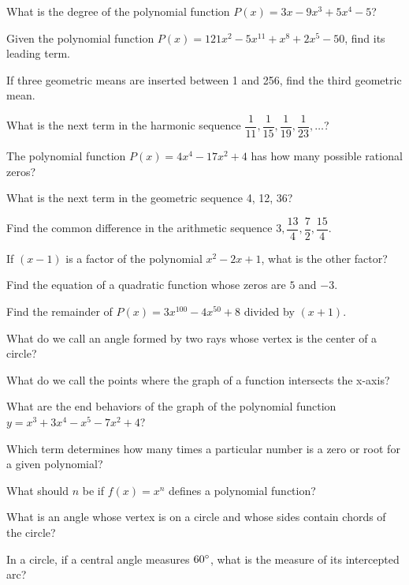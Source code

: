 \begin{questions}

\question What is the degree of the polynomial function $P(x) = 3x - 9x^3 + 5x^4 -5$?  

\question Given the polynomial function $P(x) = 121x^2 - 5x^{11} + x^8 + 2x^5 - 50$, find its  leading term.

\question If three geometric means are inserted between 1 and 256, find the third geometric mean.  


\question What is the next term in the harmonic sequence $\dfrac{1}{11}, \dfrac{1}{15}, \dfrac{1}{19}, \dfrac{1}{23}, \ldots$? 

\question The polynomial  function $P(x) = 4x^4  - 17x^2 + 4$ has how many  possible rational zeros?


\question What is the next term in the geometric sequence  4, 12, 36? 


\question Find the common difference in the arithmetic sequence $3, \dfrac{13}{4}, \dfrac{7}{2}, \dfrac{15}{4}$. 


\question If $(x-1)$ is a factor of the polynomial $x^2 - 2x + 1$, what is the other factor?



\question Find the equation of a quadratic function whose zeros are $5$ and $-3$. 


\question Find the remainder of  $P(x) = 3x^{100} -4x^{50} + 8$  divided by $(x + 1)$.


\question What do we call an angle formed by two rays whose vertex is the center of a circle? 


\question What do we call the points where the graph of a function intersects the x-axis?  



\question What are the end behaviors of the graph of the polynomial function $y = x^3 + 3x^4 - x^5 - 7x^2 + 4$? 


\question Which term determines how many times a particular number is a zero or root for a given polynomial? 



\question What should $n$ be if $f(x) = x^n$ defines a polynomial function? 


\question What is an angle whose vertex is on a circle and whose sides contain chords of the circle?  


\question In a circle, if a central angle measures $60\degree$, what is the measure of its intercepted arc? 





\end{questions}
